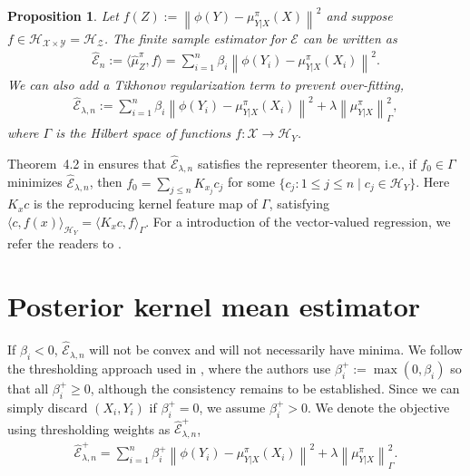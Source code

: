 \documentclass[a4paper]{article}
\renewcommand{\cal}{\mathcal}
\newcommand{\norm}[1]{\left\lVert#1\right\rVert}
\newtheorem{proposition}{Proposition}
\begin{document}
\begin{proposition}
Let $f(Z) := \norm{\phi(Y) - \mu_{Y|X}^\pi(X)}^2$ and suppose $f\in\cal{H}_{\cal{X}\times\cal{Y}} = \cal{H}_{\cal{Z}}$. The finite sample estimator for $\cal{E}$ can be written as
\begin{align}
\widehat{\cal{E}}_n := \langle \widehat{\mu}_Z^\pi, f\rangle = \sum_{i=1}^n \beta_i \norm{\phi(Y_i) - \mu_{Y|X}^\pi(X_i)}^2.
\end{align}
We can also add a Tikhonov regularization term to prevent over-fitting,
\begin{align}
\widehat{\cal{E}}_{\lambda,n} := \sum_{i=1}^n \beta_i \norm{\phi(Y_i) - \mu_{Y|X}^\pi(X_i)}^2 + \lambda \norm{\mu_{Y|X}^\pi}_{\Gamma}^2,
\end{align}
where $\Gamma$ is the Hilbert space of functions $f: \cal{X}\rightarrow \cal{H}_{Y}$.
\end{proposition}

Theorem~4.2 in \cite{micchelli2005learning} ensures that $\widehat{\cal{E}}_{\lambda,n}$ satisfies the representer theorem, i.e., if $f_0 \in \Gamma$ minimizes $\widehat{\cal{E}}_{\lambda,n}$, then $f_0 = \sum_{j\leq n} K_{x_j} c_j$ for some $\{ c_j: 1\leq j\leq n \mid c_j\in\cal{H}_Y\}$. Here $K_{x}c$ is the reproducing kernel feature map of $\Gamma$, satisfying $\langle c,f(x)\rangle_{\cal{H}_Y} = \langle K_x c,f\rangle_\Gamma $. For a introduction of the vector-valued regression, we refer the readers to \cite{micchelli2005learning}.

\section{Posterior kernel mean estimator}
If $\beta_i < 0$, $\widehat{\cal{E}}_{\lambda,n}$ will not be convex and will not necessarily have minima. We follow the thresholding approach used in \cite{nishiyama2012hilbert}, where the authors use $\beta_i^+ := \max(0,\beta_i)$ so that all $\beta_i^+ \geq 0$, although the consistency remains to be established. Since we can simply discard $(X_i,Y_i)$ if $\beta_i^+ = 0$, we assume $\beta_i^+ > 0$. We denote the objective using thresholding weights as $\widehat{\cal{E}}_{\lambda,n}^+$, 
\begin{align}
\widehat{\cal{E}}_{\lambda,n}^+ = \sum_{i=1}^{n} \beta_i^+ \norm{\phi(Y_i) - \mu_{Y|X}^\pi(X_i)}^2 + \lambda\norm{\mu_{Y|X}^\pi}_\Gamma^2.
\end{align}
\end{document}
